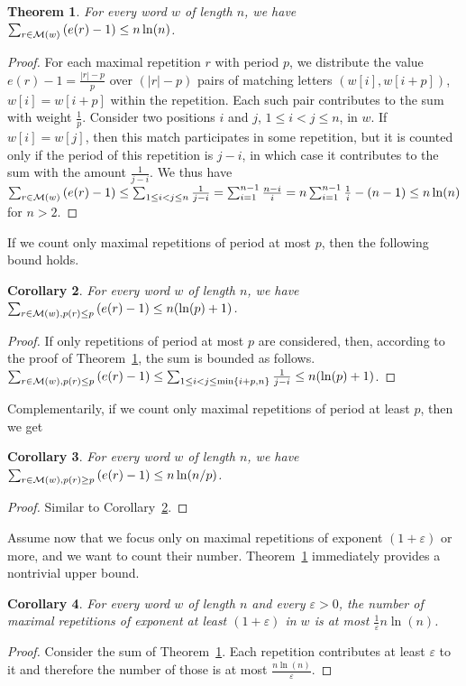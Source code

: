 \documentclass[11pt]{article}
\newtheorem{theorem}{Theorem}
\newtheorem{corollary}[theorem]{Corollary}
\def\paren#1{\left( #1 \right)}
\newcommand{\mr}[1]{{\cal M}({#1})}
\newcommand{\p}[1]{p({#1})}
\begin{document}
\begin{theorem}
\label{t1}
For every word $w$ of length $n$, we have $\sum_{r\in \mr{w}}\paren{e(r)-1}\le n\ln(n)$.
\end{theorem}
\begin{proof}
For each maximal repetition $r$ with period $p$, we distribute the value $e(r)-1=\frac{|r|-p}{p}$
over $(|r|-p)$ pairs of matching letters $(w[i],w[i+p])$, $w[i]=w[i+p]$
within the repetition. Each such pair contributes to the sum
with weight $\frac{1}{p}$. 
Consider two positions $i$ and $j$, $1\le i<j\le n$, in $w$. 
If $w[i]=w[j]$, then this match participates in some repetition, but it
is counted only if the period of this repetition is $j-i$, in which
case it
contributes to the sum with the amount 
$\frac{1}{j-i}$. 
We thus have $\sum_{r\in \mr{w}}\paren{e(r)-1}\le\sum_{1\le i<j\leq
  n}\frac{1}{j-i}=\sum_{i=1}^{n-1}\frac{n-i}{i}=n\sum_{i=1}^{n-1}\frac{1}{i}-(n-1)\le n\ln(n)$ for $n>2$.
\end{proof}

If we count only maximal repetitions of period at most $p$, then the
following bound holds. 
\begin{corollary}
\label{c1}
For every word $w$ of length $n$, we have $\sum_{r\in \mr{w},\p{r}\leq
p}\paren{e(r)-1}\le n(\ln(p)+1)$.
\end{corollary}
\begin{proof}
If only repetitions of period at most $p$ are considered, then,
according to the proof of Theorem~\ref{t1}, the sum is bounded as follows. $\sum_{r\in \mr{w},\p{r}\leq
p}\paren{e(r)-1}\leq \sum_{1\le i<j\leq \min\{i+p,n\}}\frac{1}{j-i}\le n(\ln(p)+1)$.
\end{proof}

Complementarily, if we count only maximal repetitions of period at
least $p$, then we get
\begin{corollary}
\label{c1a}
For every word $w$ of length $n$, we have $\sum_{r\in \mr{w},\p{r}\geq
p}\paren{e(r)-1}\le n\ln(n/p)$.
\end{corollary}
\begin{proof}
Similar to 
Corollary~\ref{c1}. 
\end{proof}

Assume now that we focus only on maximal repetitions of exponent
$(1+\varepsilon)$ or more, and we want to count their number. 
Theorem~\ref{t1} immediately provides a nontrivial upper bound. 

\begin{corollary}
\label{c2}
For every word $w$ of length $n$ and every $\varepsilon>0$, the number of maximal repetitions
of exponent at least $(1+\varepsilon)$ in $w$ is at most
$\frac{1}{\varepsilon}{n\ln(n)}$. 
\end{corollary}
\begin{proof}
Consider the sum of Theorem~\ref{t1}. Each repetition contributes at
least $\varepsilon$ to it and therefore the number of those is at most $\frac{n\ln(n)}{\varepsilon}$. 
\end{proof}
\end{document}
